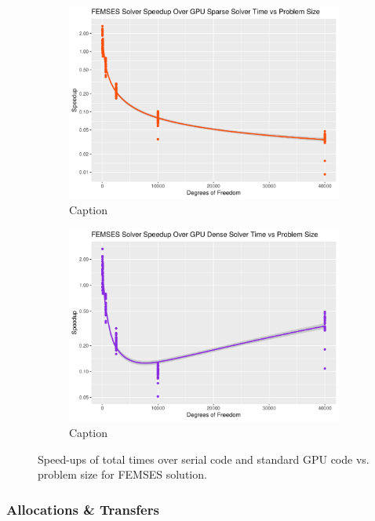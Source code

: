 \begin{figure}
\begin{subfigure}{0.48\linewidth}
		\includegraphics[width=\linewidth]{Plots/solve_femses_sparse_gpu_speedup_vs_n}
		\caption{Caption}
		\label{fig:solve_femses_gpu_sparse}
	\end{subfigure}\hfill
	\begin{subfigure}{0.48\linewidth}
		\centering
		\includegraphics[width=\linewidth]{Plots/solve_femses_dense_gpu_speedup_vs_n}
		\caption{Caption}
		\label{fig:solve_femses_gpu_dense}
	\end{subfigure}
	\caption{Speed-ups of total times over serial code and standard GPU code vs. problem size for FEMSES solution.}
	\label{fig:solve_femses}
\end{figure}

\subsubsection{Allocations \& Transfers}

